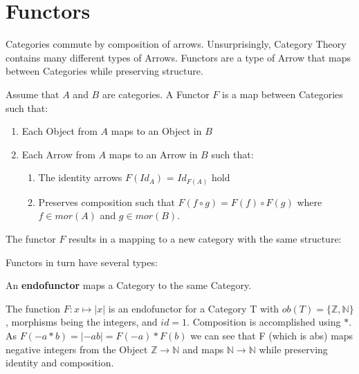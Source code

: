 \documentclass{article}
\begin{document}
\section{Functors}
Categories commute by composition of arrows. Unsurprisingly, Category Theory contains many different types of Arrows. Functors are a type of Arrow that maps between Categories while preserving structure.
\begin{definition}
    Assume that $A$ and $B$ are categories. A Functor $F$ is a map between Categories such that:
    \begin{enumerate}
        \item Each Object from $A$ maps to an Object in $B$
        \item Each Arrow from $A$ maps to an Arrow in $B$ such that:
        \begin{enumerate}
            \item The identity arrows  $F(Id_A)$ = $Id_{F(A)}$ hold
            \item Preserves composition such that $F(f \circ g) = F(f)\circ F(g)$ where $f \in mor(A)$ and $g \in mor(B)$.
        \end{enumerate}
    \end{enumerate}
\end{definition}
\begin{center}
The functor $F$ results in a mapping to a new category with the same structure:
\end{center}
Functors in turn have several types:
\begin{definition}
    An \textbf{endofunctor} maps a Category to the same Category.
\end{definition}
\begin{example}
The function $F: x \mapsto |x|$ is an endofunctor for a Category T with $ob(T) = \{\mathbb{Z}, \mathbb{N}\}$, morphisms being the integers, and $id = 1$. Composition is accomplished using $*$. As $F(-a * b) = |-ab| = F(-a) * F(b)$ we can see that F (which is abs) maps negative integers from the Object $\mathbb{Z} \to \mathbb{N}$ and maps $\mathbb{N} \to \mathbb{N}$ while preserving identity and composition.
\end{example}
\end{document}
